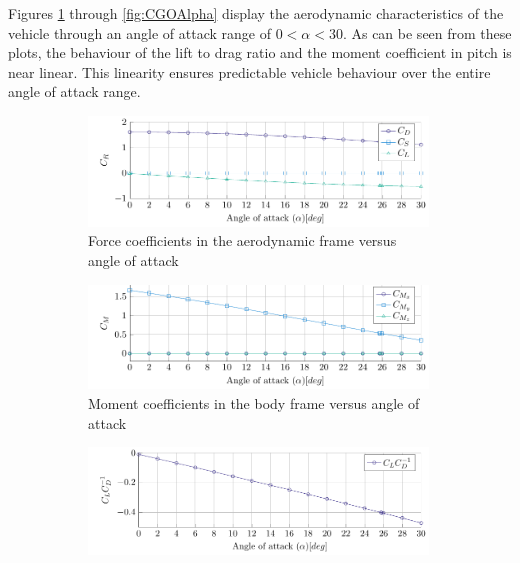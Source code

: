 Figures \ref{fig:CLCDCSAlpha} through \ref{fig:CGOAlpha} display the aerodynamic characteristics of the vehicle through an angle of attack range of $0<\alpha<30$. As can be seen from these plots, the behaviour of the lift to drag ratio and the moment coefficient in pitch is near linear. This linearity ensures predictable vehicle behaviour over the entire angle of attack range.
 
 \begin{figure}[h]
 	\centering
 	
 	\begin{subfigure}[b]{0.49\textwidth}
 		\includegraphics[width=0.99\textwidth]{./Figure/Aerodynamics/CDCSCLAlpha.pdf}
 		\caption{Force coefficients in the aerodynamic frame versus angle of attack}
 		\label{fig:CLCDCSAlpha}
 	\end{subfigure}
 	\begin{subfigure}[b]{0.49\textwidth}
 		\includegraphics[width=0.99\textwidth]{./Figure/Aerodynamics/CMXCMYCMZAlpha.pdf}
 		\caption{Moment coefficients in the body frame versus angle of attack}
 		\label{fig:CMxCMyCMzAlpha}
 	\end{subfigure}
 	\begin{subfigure}[b]{0.49\textwidth}
 		\includegraphics[width=0.99\textwidth]{./Figure/Aerodynamics/CLCDAlpha.pdf}

\end{subfigure}
\end{figure}

